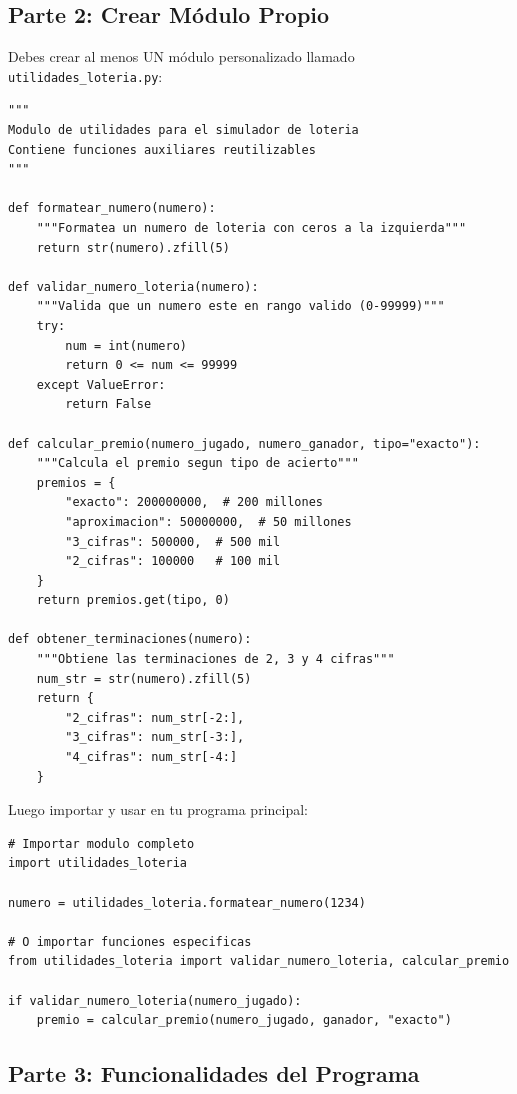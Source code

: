 \documentclass[12pt,a4paper]{article}
\begin{document}
\subsection{Parte 2: Crear Módulo Propio}

Debes crear al menos UN módulo personalizado llamado \texttt{utilidades\_loteria.py}:

\begin{lstlisting}[caption=Archivo utilidades\_loteria.py]
"""
Modulo de utilidades para el simulador de loteria
Contiene funciones auxiliares reutilizables
"""

def formatear_numero(numero):
    """Formatea un numero de loteria con ceros a la izquierda"""
    return str(numero).zfill(5)

def validar_numero_loteria(numero):
    """Valida que un numero este en rango valido (0-99999)"""
    try:
        num = int(numero)
        return 0 <= num <= 99999
    except ValueError:
        return False

def calcular_premio(numero_jugado, numero_ganador, tipo="exacto"):
    """Calcula el premio segun tipo de acierto"""
    premios = {
        "exacto": 200000000,  # 200 millones
        "aproximacion": 50000000,  # 50 millones
        "3_cifras": 500000,  # 500 mil
        "2_cifras": 100000   # 100 mil
    }
    return premios.get(tipo, 0)

def obtener_terminaciones(numero):
    """Obtiene las terminaciones de 2, 3 y 4 cifras"""
    num_str = str(numero).zfill(5)
    return {
        "2_cifras": num_str[-2:],
        "3_cifras": num_str[-3:],
        "4_cifras": num_str[-4:]
    }
\end{lstlisting}

Luego importar y usar en tu programa principal:

\begin{lstlisting}[caption=Importar modulo propio en main.py]
# Importar modulo completo
import utilidades_loteria

numero = utilidades_loteria.formatear_numero(1234)

# O importar funciones especificas
from utilidades_loteria import validar_numero_loteria, calcular_premio

if validar_numero_loteria(numero_jugado):
    premio = calcular_premio(numero_jugado, ganador, "exacto")
\end{lstlisting}

\subsection{Parte 3: Funcionalidades del Programa}
\end{document}
